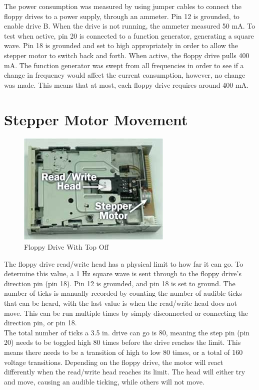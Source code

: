 \documentclass[11pt, a4paper]{report}
\begin{document}
The power consumption was measured by using jumper cables to connect the floppy drives to a power supply, through an ammeter. Pin 12 is grounded, to enable drive B. When the drive is not running, the ammeter measured 50 mA. To test when active, pin 20 is connected to a function generator, generating a square wave. Pin 18 is grounded and set to high appropriately in order to allow the stepper motor to switch back and forth. When active, the floppy drive pulls 400 mA. The function generator was swept from all frequencies in order to see if a change in frequency would affect the current consumption, however, no change was made. This means that at most, each floppy drive requires around 400 mA. \\

\section{Stepper Motor Movement}

\begin{figure}[H]
\hspace*{-2cm}    
    \centering
    \includegraphics[width=.3\textwidth]{floppydrive_coveroff.jpg}
    \caption{Floppy Drive With Top Off}
    \label{fig:coveroff}
\end{figure}

The floppy drive read/write head has a physical limit to how far it can go. To determine this value, a 1 Hz square wave is sent through to the floppy drive's direction pin (pin 18). Pin 12 is grounded, and pin 18 is set to ground. The number of ticks is manually recorded by counting the number of audible ticks that can be heard, with the last value is when the read/write head does not move. This can be run multiple times by simply disconnected or connecting the direction pin, or pin 18. \\

The total number of ticks a 3.5 in. drive can go is 80, meaning the step pin (pin 20) needs to be toggled high 80 times before the drive reaches the limit. This means there needs to be a transition of high to low 80 times, or a total of 160 voltage transitions. Depending on the floppy drive, the motor will react differently when the read/write head reaches its limit. The head will either try and move, causing an audible ticking, while others will not move. \\
\end{document}
